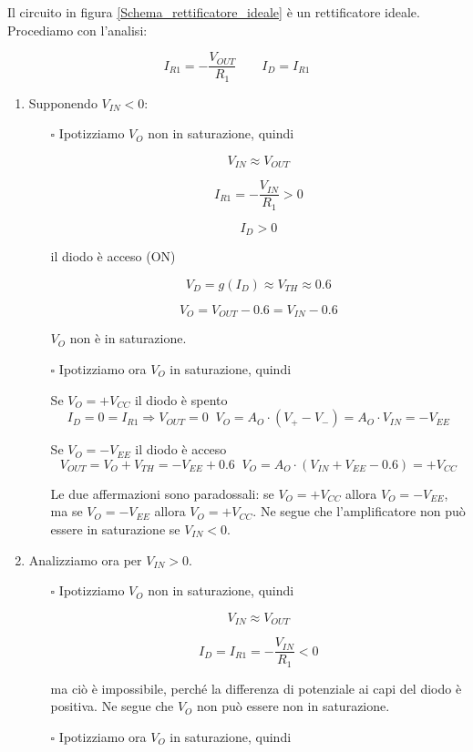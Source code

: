 \documentclass{article}
\begin{document}
Il circuito in figura \ref{Schema_rettificatore_ideale} è un rettificatore ideale. Procediamo con l'analisi:

\[I_{R1} = -\frac{V_{OUT}}{R_1} \quad\quad I_D = I_{R1}\]
\begin{enumerate}
\item Supponendo $V_{IN} < 0$:
\begin{itemize}
  \item [$\square$] Ipotizziamo $V_O$ non in saturazione, quindi

\[V_{IN} \approx V_{OUT}\]

\[I_{R1} = -\frac{V_{IN}}{R_1} > 0\]

\[I_D > 0\]

il diodo è acceso (ON)

\[V_D = g(I_D) \approx V_{TH} \approx 0.6\]

\[V_O = V_{OUT} - 0.6 = V_{IN} - 0.6\]

$V_O$ non è in saturazione.

\item [$\square$] Ipotizziamo ora $V_O$ in saturazione, quindi

\vspace{2mm}

Se $V_O = +V_{CC}$ il diodo è spento
\[ I_D = 0 = I_{R1} \Rightarrow V_{OUT} = 0 \; \; V_O = A_O \cdot (V_+ - V_-) = A_O \cdot V_{IN} = -V_{EE}\]

Se  $V_O = -V_{EE}$ il diodo è acceso
\[V_{OUT} = V_O + V_{TH} = -V_{EE} + 0.6 \; \; V_O = A_O \cdot (V_{IN} + V_{EE} - 0.6) = +V_{CC}\]

Le due affermazioni sono paradossali: se $V_O = +V_{CC}$ allora $V_O = -V_{EE}$, ma se $V_O = -V_{EE}$ allora $V_O = +V_{CC}$. Ne segue che l'amplificatore non può essere in saturazione se $V_{IN} < 0$.
\end{itemize}

\item Analizziamo ora per $V_{IN} > 0$.
\begin{itemize}
\item [$\square$] Ipotizziamo $V_O$ non in saturazione, quindi

\[V_{IN} \approx V_{OUT}\]

\[I_D = I_{R1} = - \frac{V_{IN}}{R_1} < 0\]

ma ciò è impossibile, perché la differenza di potenziale ai capi del diodo è positiva. Ne segue che $V_O$ non può essere non in saturazione.

\item [$\square$] Ipotizziamo ora $V_O$ in saturazione, quindi


\end{itemize}
\end{enumerate}
\end{document}

